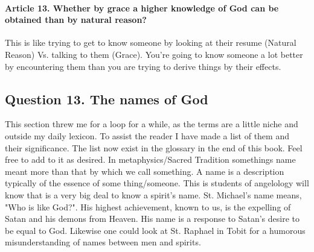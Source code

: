 \documentclass{ucetd}
\begin{document}
\paragraph{Article 13. Whether by grace a higher knowledge of God can be obtained than by natural reason?}
This is like trying to get to know someone by looking at their resume (Natural Reason) Vs. talking to them (Grace). You're going to know someone a lot better by encountering them than you are trying to derive things by their effects.


\subsection{Question 13. The names of God}
This section threw me for a loop for a while, as the terms are a little niche and outside my daily lexicon. To assist the reader I have made a list of them and their significance. The list now exist in the glossary in the end of this book. Feel free to add to it as desired. In metaphysics/Sacred Tradition somethings \gls{name} meant more than that by which we call something. A name is a description typically of the essence of some thing/someone. This is students of angelology will know that is a very big deal to know a spirit's name. St. Michael's name means, "Who is like God?". His highest achievement, known to us, is the expelling of Satan and his demons from Heaven. His name is a response to Satan's desire to be equal to God. Likewise one could look at St. Raphael in Tobit for a humorous misunderstanding of names between men and spirits. 
\end{document}
